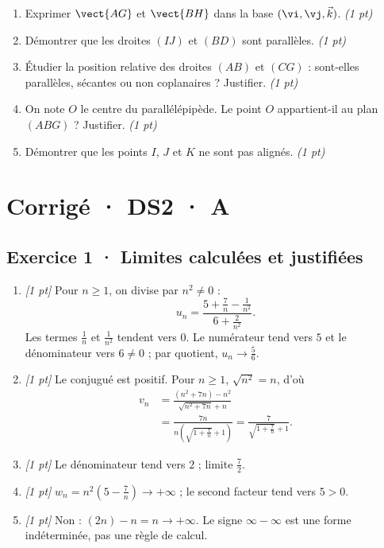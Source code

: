 \begin{enumerate}

\item Exprimer $\vect{AG}$ et $\vect{BH}$ dans la base $(\vi,\vj,\vec k)$. \hfill\textit{(1 pt)}

\item Démontrer que les droites $(IJ)$ et $(BD)$ sont parallèles. \hfill\textit{(1 pt)}

\item Étudier la position relative des droites $(AB)$ et $(CG)$ : sont-elles parallèles, sécantes ou non coplanaires ? Justifier. \hfill\textit{(1 pt)}

\item On note $O$ le centre du parallélépipède. Le point $O$ appartient-il au plan $(ABG)$ ? Justifier. \hfill\textit{(1 pt)}

\item Démontrer que les points $I$, $J$ et $K$ ne sont pas alignés. \hfill\textit{(1 pt)}

\end{enumerate}

\ifprof\clearpage

\section*{Corrigé · DS2 · A}\label{cor:2-3}

\subsection*{Exercice 1 · Limites calculées et justifiées}\begin{enumerate}

\item \textit{[1 pt]} Pour $n\ge1$, on divise par $n^2\ne0$ :
\[u_n=\frac{5+\frac{7}{n}-\frac{1}{n^2}}{6+\frac{2}{n^2}}.\]
Les termes $\frac{1}{n}$ et $\frac{1}{n^2}$ tendent vers $0$. Le numérateur tend vers $5$ et le dénominateur vers $6\ne0$ ; par quotient, $u_n\to\frac{5}{6}$.

\item \textit{[1 pt]} Le conjugué est positif. Pour $n\ge1$, $\sqrt{n^2}=n$, d'où
\[\begin{aligned}v_n&=\frac{(n^2+7n)-n^2}{\sqrt{n^2+7n}+n}\\&=\frac{7n}{n(\sqrt{1+\frac{7}{n}}+1)}=\frac{7}{\sqrt{1+\frac{7}{n}}+1}.\end{aligned}\]

\item \textit{[1 pt]} Le dénominateur tend vers $2$ ; limite $\frac{7}{2}$.

\item \textit{[1 pt]} $w_n=n^2(5-\frac{7}{n})\to+\infty$ ; le second facteur tend vers $5>0$.

\item \textit{[1 pt]} Non : $(2n)-n=n\to+\infty$. Le signe $\infty-\infty$ est une forme indéterminée, pas une règle de calcul.

\end{enumerate}

